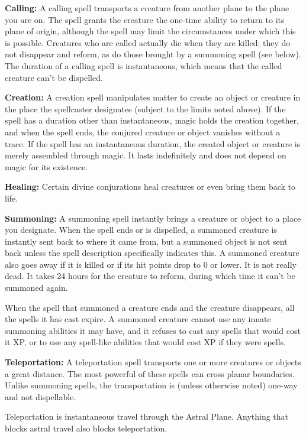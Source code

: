 \documentclass{article}
\begin{document}
\textbf{Calling:} A calling spell transports a creature from another plane to the 
plane you are on. The spell grants the creature the one-time ability to return 
to its plane of origin, although the spell may limit the circumstances under which 
this is possible. Creatures who are called actually die when they are killed; they 
do not disappear and reform, as do those brought by a summoning spell (see below). 
The duration of a calling spell is instantaneous, which means that the called creature 
can't be dispelled.

\textbf{Creation: }A creation spell manipulates matter to create an object or creature 
in the place the spellcaster designates (subject to the limits noted above). If 
the spell has a duration other than instantaneous, magic holds the creation together, 
and when the spell ends, the conjured creature or object vanishes without a trace. 
If the spell has an instantaneous duration, the created object or creature is merely 
assembled through magic. It lasts indefinitely and does not depend on magic for 
its existence.

\textbf{Healing: }Certain divine conjurations heal creatures or even bring them 
back to life.

\textbf{Summoning:} A summoning spell instantly brings a creature or object to 
a place you designate. When the spell ends or is dispelled, a summoned creature 
is instantly sent back to where it came from, but a summoned object is not sent 
back unless the spell description specifically indicates this. A summoned creature 
also goes away if it is killed or if its hit points drop to 0 or lower. It is not 
really dead. It takes 24 hours for the creature to reform, during which time it 
can't be summoned again.

When the spell that summoned a creature ends and the creature disappears, all the 
spells it has cast expire. A summoned creature cannot use any innate summoning 
abilities it may have, and it refuses to cast any spells that would cost it XP, 
or to use any spell-like abilities that would cost XP if they were spells.

\textbf{Teleportation:} A teleportation spell transports one or more creatures 
or objects a great distance. The most powerful of these spells can cross planar 
boundaries. Unlike summoning spells, the transportation is (unless otherwise noted) 
one-way and not dispellable.

Teleportation is instantaneous travel through the Astral Plane. Anything that blocks 
astral travel also blocks teleportation.
\end{document}
